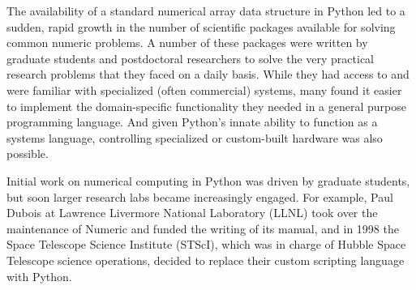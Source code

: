 \documentclass[fleqn,10pt]{wlscirep}
\begin{document}
The availability of a standard numerical array data structure in
Python led to a sudden, rapid growth in the number of scientific
packages available for solving common numeric problems.
A number of these packages were written by graduate students and
postdoctoral researchers to solve the very practical research problems
that they faced on a daily basis.  While they had access to and were
familiar with specialized (often commercial) systems, many found
it easier to implement the domain-specific functionality they needed
in a general purpose programming language.  And given Python's innate
ability to function as a systems language, controlling specialized or
custom-built hardware was also possible.

Initial work on numerical computing in Python was driven by graduate
students, but soon larger research labs became increasingly engaged.
For example, Paul Dubois at Lawrence Livermore National Laboratory (LLNL) took over the
maintenance of Numeric and funded the writing of its
manual\cite{Numeric-manual}, and
in 1998 the Space Telescope Science Institute (STScI), which was in charge of 
Hubble Space Telescope science operations, decided to replace their
custom scripting language with Python\cite{STScI-slither}.


%

\end{document}
